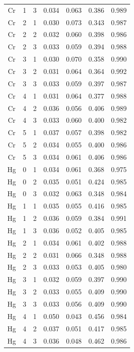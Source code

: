 \documentclass[ms, hidelinks]{uncgdissertationexp3}
\theoremstyle{plain}
\theoremstyle{definition}
\theoremstyle{remark}
\begin{document}
\begin{longtable}{ccccccc}
  Cr & 1 & 3 & 0.034 & 0.063 & 0.386 & 0.989\\
  \rowcolor{gray!6}  Cr & 2 & 1 & 0.030 & 0.073 & 0.343 & 0.987\\
  Cr & 2 & 2 & 0.032 & 0.060 & 0.398 & 0.986\\
  \rowcolor{gray!6}  Cr & 2 & 3 & 0.033 & 0.059 & 0.394 & 0.988\\
  Cr & 3 & 1 & 0.030 & 0.070 & 0.358 & 0.990\\
  \rowcolor{gray!6}  Cr & 3 & 2 & 0.031 & 0.064 & 0.364 & 0.992\\
  Cr & 3 & 3 & 0.033 & 0.059 & 0.397 & 0.987\\
  \rowcolor{gray!6}  Cr & 4 & 1 & 0.031 & 0.064 & 0.377 & 0.988\\
  Cr & 4 & 2 & 0.036 & 0.056 & 0.406 & 0.989\\
  \rowcolor{gray!6}  Cr & 4 & 3 & 0.033 & 0.060 & 0.400 & 0.982\\
  Cr & 5 & 1 & 0.037 & 0.057 & 0.398 & 0.982\\
  \rowcolor{gray!6}  Cr & 5 & 2 & 0.034 & 0.055 & 0.400 & 0.986\\
  Cr & 5 & 3 & 0.034 & 0.061 & 0.406 & 0.986\\
  \rowcolor{gray!6}  Hg & 0 & 1 & 0.034 & 0.061 & 0.368 & 0.975\\
  Hg & 0 & 2 & 0.035 & 0.051 & 0.424 & 0.985\\
  \rowcolor{gray!6}  Hg & 0 & 3 & 0.032 & 0.063 & 0.348 & 0.984\\
  Hg & 1 & 1 & 0.035 & 0.055 & 0.416 & 0.985\\
  \rowcolor{gray!6}  Hg & 1 & 2 & 0.036 & 0.059 & 0.384 & 0.991\\
  Hg & 1 & 3 & 0.036 & 0.052 & 0.405 & 0.985\\
  \rowcolor{gray!6}  Hg & 2 & 1 & 0.034 & 0.061 & 0.402 & 0.988\\
  Hg & 2 & 2 & 0.031 & 0.066 & 0.348 & 0.988\\
  \rowcolor{gray!6}  Hg & 2 & 3 & 0.033 & 0.053 & 0.405 & 0.980\\
  Hg & 3 & 1 & 0.032 & 0.059 & 0.397 & 0.990\\
  \rowcolor{gray!6}  Hg & 3 & 2 & 0.033 & 0.055 & 0.409 & 0.990\\
  Hg & 3 & 3 & 0.033 & 0.056 & 0.409 & 0.990\\
  \rowcolor{gray!6}  Hg & 4 & 1 & 0.050 & 0.043 & 0.456 & 0.984\\
  Hg & 4 & 2 & 0.037 & 0.051 & 0.417 & 0.985\\
  \rowcolor{gray!6}  Hg & 4 & 3 & 0.036 & 0.048 & 0.462 & 0.986\\

\end{longtable}
\end{document}

